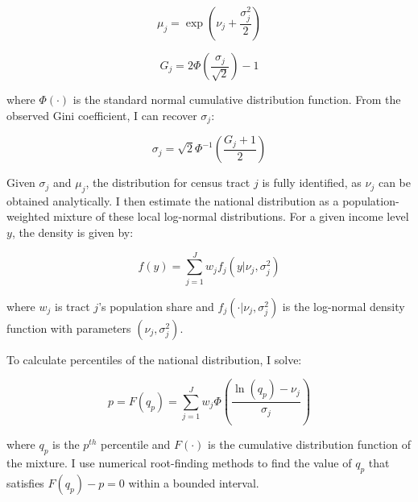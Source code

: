 \begin{equation}
\mu_j = \exp\left(\nu_j + \frac{\sigma_j^2}{2}\right)
\end{equation}

\begin{equation}
G_j = 2\Phi\left(\frac{\sigma_j}{\sqrt{2}}\right) - 1
\end{equation}

where $\Phi(\cdot)$ is the standard normal cumulative distribution function. From the observed Gini coefficient, I can recover $\sigma_j$:

\begin{equation}
\sigma_j = \sqrt{2}\Phi^{-1}\left(\frac{G_j + 1}{2}\right)
\end{equation}

Given $\sigma_j$ and $\mu_j$, the distribution for census tract $j$ is fully identified, as $\nu_j$ can be obtained analytically. I then estimate the national distribution as a population-weighted mixture of these local log-normal distributions. For a given income level $y$, the density is given by:

\begin{equation}
f(y) = \sum_{j=1}^{J} w_j f_j(y|\nu_j,\sigma_j^2)
\end{equation}

where $w_j$ is tract $j$'s population share and $f_j(\cdot|\nu_j,\sigma_j^2)$ is the log-normal density function with parameters $(\nu_j,\sigma_j^2)$.

To calculate percentiles of the national distribution, I solve:

\begin{equation}
p = F(q_p) = \sum_{j=1}^{J} w_j \Phi\left(\frac{\ln(q_p) - \nu_j}{\sigma_j}\right)
\end{equation}

where $q_p$ is the $p^{th}$ percentile and $F(\cdot)$ is the cumulative distribution function of the mixture. I use numerical root-finding methods to find the value of $q_p$ that satisfies $F(q_p) - p = 0$ within a bounded interval.


